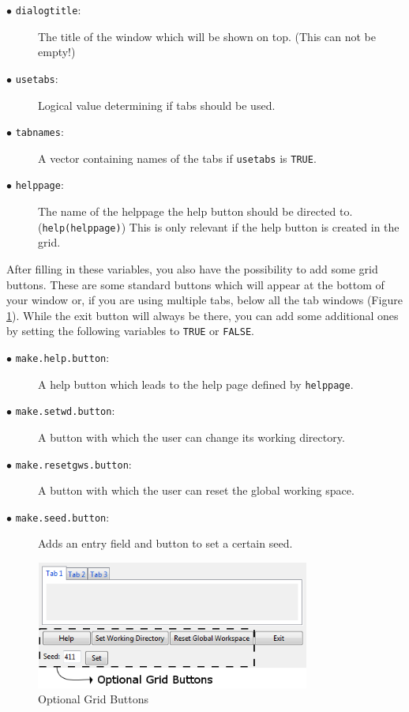 \documentclass[a4paper]{article}\usepackage[]{graphicx}\usepackage[]{color}
\begin{document}
\begin{description}
  \item[$\bullet$ \texttt{dialogtitle}:] The title of the window which will be
  shown on top. (This can not be empty!)
  
  \item[$\bullet$ \texttt{usetabs}:] Logical value determining if tabs should be
  used.
  \item[$\bullet$ \texttt{tabnames}:] A vector containing names of the tabs if
  \verb|usetabs| is \verb|TRUE|. 
  
  \item[$\bullet$ \texttt{helppage}:] The name of the helppage the help button
  should be directed to. (\verb|help(helppage)|) This is only relevant if the
  help button is created in the grid.
\end{description}
\noindent After filling in these variables, you also have the possibility to add
some grid buttons. These are some standard buttons which will appear at the
bottom of your window or, if you are using multiple tabs, below all the tab
windows (Figure \ref{optionalgrid}). While the exit button will always be there,
you can add some additional ones by setting the following variables to
\verb|TRUE| or \verb|FALSE|. 
\begin{description}
  \item[$\bullet$ \texttt{make.help.button}:] A help button which leads to the
  help page defined by \verb|helppage|.
  \item[$\bullet$ \texttt{make.setwd.button}:] A button with which the user can
  change its working directory.
  \item[$\bullet$ \texttt{make.resetgws.button}:] A button with which the user
  can reset the global working space.
  \item[$\bullet$ \texttt{make.seed.button}:] Adds an entry field and button to
  set a certain seed.
\end{description}
\begin{figure}[H]
\centering
\includegraphics[width=9cm]{figures/optionalgrid.png}
\caption{Optional Grid Buttons \label{optionalgrid}}
\end{figure}
\end{document}
